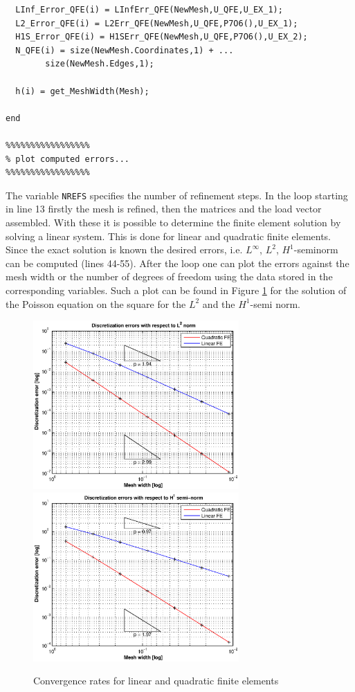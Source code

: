 \begin{lstlisting}
  LInf_Error_QFE(i) = LInfErr_QFE(NewMesh,U_QFE,U_EX_1);
  L2_Error_QFE(i) = L2Err_QFE(NewMesh,U_QFE,P7O6(),U_EX_1);
  H1S_Error_QFE(i) = H1SErr_QFE(NewMesh,U_QFE,P7O6(),U_EX_2);
  N_QFE(i) = size(NewMesh.Coordinates,1) + ...
  		size(NewMesh.Edges,1);
    
  h(i) = get_MeshWidth(Mesh);
    
end

%%%%%%%%%%%%%%%%%
% plot computed errors...
%%%%%%%%%%%%%%%%%
\end{lstlisting}

The variable \texttt{NREFS} specifies the number of refinement steps. In the loop starting in line 13 firstly the mesh is refined, then the matrices and the load vector assembled. With these it is possible to determine the finite element solution by solving a linear system. This is done for linear and quadratic finite elements. Since the exact solution is known the desired errors, i.e. $L^\infty$, $L^2$, $H^1$-seminorm can be computed (lines 44-55). After the loop one can plot the errors against the mesh width or the number of degrees of freedom using the data stored in the corresponding variables. Such a plot can be found in Figure \ref{fig:lfeqfe} for the solution of the Poisson equation on the square for the $L^2$ and the $H^1$-semi norm.

\begin{figure}[htb]
  \centering
  \includegraphics[width=0.7\textwidth]{L2lfeqfe.eps}
  \includegraphics[width=0.7\textwidth]{H1lfeqfe.eps}
  \caption{Convergence rates for linear and quadratic finite elements}
  \label{fig:lfeqfe}
\end{figure}







